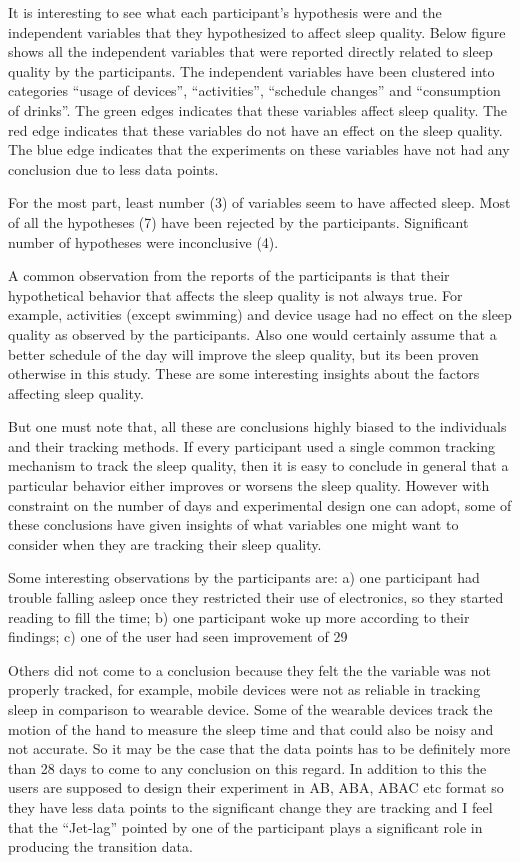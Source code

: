 It is interesting to see what each participant’s hypothesis were and the independent variables that they hypothesized to affect sleep quality. Below figure shows all the independent variables that were reported directly related to sleep quality by the participants. The independent variables have been clustered into categories “usage of devices”, “activities”, “schedule changes” and “consumption of drinks”. The green edges indicates that these variables affect sleep quality. The red edge indicates that these variables do not have an effect on the sleep quality. The blue edge indicates that the experiments on these variables have not had any conclusion due to less data points.

For the most part, least number (3) of variables seem to have affected sleep. Most of all the hypotheses (7) have been rejected by the participants. Significant number of hypotheses were inconclusive (4). 

A common observation from the reports of the participants is that their hypothetical behavior that affects the sleep quality is not always true. For example, activities (except swimming) and device usage had no effect on the sleep quality as observed by the participants. Also one would certainly assume that a better schedule of the day will improve the sleep quality, but its been proven otherwise in this study. These are some interesting insights about the factors affecting sleep quality. 

But one must note that, all these are conclusions highly biased to the individuals and their tracking methods. If every participant used a single common tracking mechanism to track the sleep quality, then it is easy to conclude in general that a particular behavior either improves or worsens the sleep quality. However with constraint on the number of days and experimental design one can adopt, some of these conclusions have given insights of what variables one might want to consider when they are tracking their sleep quality.

Some interesting observations by the participants are: a) one participant had trouble falling asleep once they restricted their use of electronics, so they started reading to fill the time; b) one participant woke up more according to their findings; c) one of the user had seen improvement of 29%

Others did not come to a conclusion because they felt the the variable was not properly tracked, for example, mobile devices were not as reliable in tracking sleep in comparison to wearable device. Some of the wearable devices track the motion of the hand to measure the sleep time and that could also be noisy and not accurate. So it may be the case that the data points has to be definitely more than 28 days to come to any conclusion on this regard. In addition to this the users are supposed to design their experiment in AB, ABA, ABAC etc format so they have less data points to the significant change they are tracking and I feel that the “Jet-lag” pointed by one of the participant plays a significant role in producing the transition data.

